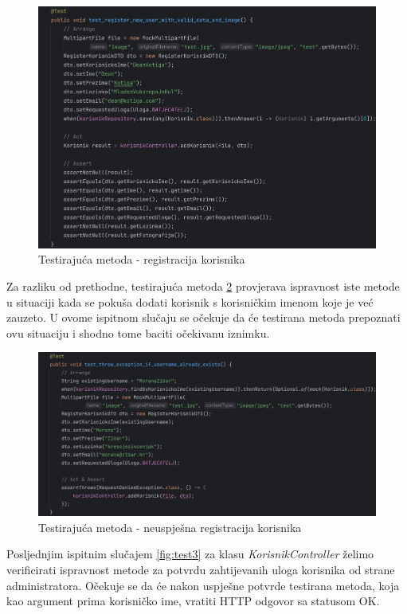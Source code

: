 \begin{figure}[H]
	\includegraphics[scale=0.15]{slike/test1.png}
	\centering
	\caption{Testirajuća metoda - registracija korisnika}
	\label{fig:test1}
\end{figure}

Za razliku od prethodne, testirajuća metoda \ref{fig:test2} provjerava ispravnost iste metode u situaciji kada se pokuša dodati korisnik s korisničkim imenom koje je već zauzeto.  U ovome ispitnom slučaju se očekuje da će testirana metoda prepoznati ovu situaciju i shodno tome baciti očekivanu iznimku.

\begin{figure}[H]
	\includegraphics[scale=0.15]{slike/test2.png}
	\centering
	\caption{Testirajuća metoda - neuspješna registracija korisnika}
	\label{fig:test2}
\end{figure}

Posljednjim ispitnim slučajem \ref{fig:test3} za klasu \textit{KorisnikController} želimo verificirati  ispravnost metode za potvrdu zahtijevanih uloga korisnika od strane administratora. Očekuje se da će nakon uspješne potvrde testirana metoda, koja kao argument prima korisničko ime, vratiti HTTP odgovor sa statusom OK.


